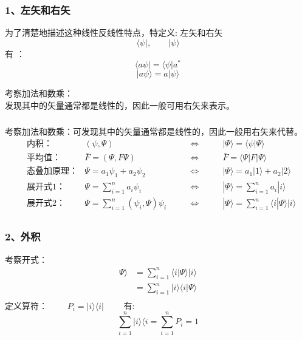 \begin{frame}
    \frametitle{1、左矢和右矢}
    \begin{definition}
    为了清楚地描述这种线性反线性特点，特定义: 左矢和右矢
    $$\langle \psi |, \qquad |\psi \rangle $$ 
    有 ： $$\langle a\psi | = \langle \psi |a^* $$
    $$ |a\psi \rangle = a|\psi \rangle$$ 
    \end{definition}
    考察加法和数乘：\\
    发现其中的矢量通常都是线性的，因此一般可用右矢来表示。
\end{frame} 

\begin{frame}
    \frametitle{}
    考察加法和数乘：可发现其中的矢量通常都是线性的，因此一般用右矢来代替。\\
    $$\begin{aligned}
    &\text{内积：}   & (\psi,\Psi)  & \qquad\Leftrightarrow \qquad & | \Psi \rangle =\langle \psi | \Psi \rangle \\
    &\text{平均值：}   & \bar{F}=(\Psi,F\Psi)  & \qquad\Leftrightarrow \qquad & \bar{F} =\langle \Psi|F | \Psi \rangle \\
    &\text{态叠加原理：}   & \Psi=a_1 \psi_1+ a_2 \psi_2  & \qquad\Leftrightarrow \qquad &| \Psi \rangle =a_1 |1 \rangle+ a_2 |2 \rangle\\
    &\text{展开式1：}     & \Psi=\sum\limits_{i=1} ^n a_i \psi_i & \qquad \Leftrightarrow \qquad &| \Psi \rangle =\sum\limits_{i=1} ^n a_i |i \rangle\\
    &\text{展开式2：}     & \Psi=\sum\limits_{i=1} ^n (\psi_i ,\Psi) \psi_i & \qquad \Leftrightarrow \qquad &| \Psi \rangle =\sum\limits_{i=1} ^n \langle i | \Psi \rangle |i\rangle\\
    \end{aligned}
    $$
\end{frame} 
 

\begin{frame}
    \frametitle{2、外积}
    考察开式：
    $$\begin{aligned}
    \Psi \rangle &= \sum\limits_{i=1} ^n \langle i | \Psi \rangle |i\rangle\\
                 &= \sum\limits_{i=1} ^n |i\rangle\langle i | \Psi \rangle \\
    \end{aligned}
    $$
    定义算符： $ \qquad  P_i = |i\rangle\langle i | \qquad $ 有: \\
    $$\sum\limits_{i=1} ^n |i\rangle\langle i = \sum\limits_{i=1} ^n P_i =1 $$

\end{frame} 

